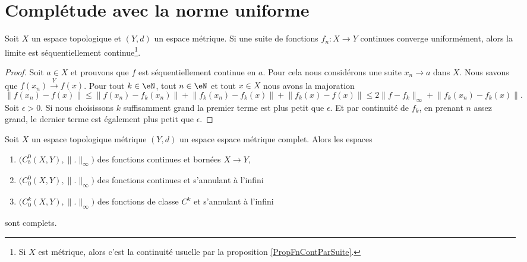 
\section{Complétude avec la norme uniforme}

\begin{proposition}\label{PropCZslHBx}
    Soit \( X\) un espace topologique et \( (Y,d)\) un espace métrique. Si une suite de fonctions \( f_n\colon X\to Y\) continues converge uniformément, alors la limite est séquentiellement continue\footnote{Si \( X\) est métrique, alors c'est la continuité usuelle par la proposition \ref{PropFnContParSuite}.}.
\end{proposition}

\begin{proof}
    Soit \( a\in X\) et prouvons que \( f\) est séquentiellement continue en \( a\). Pour cela nous considérons une suite \( x_n\to a\) dans \( X\). Nous savons que \( f(x_n)\stackrel{Y}{\longrightarrow}f(x)\). Pour tout \(k\in \eN\), tout \( n\in \eN\) et tout \( x\in X\) nous avons la majoration
    \begin{equation}
        \big\| f(x_n)-f(x) \big\|\leq \big\| f(x_n)-f_k(x_n) \big\|+\big\| f_k(x_n)-f_k(x) \big\|+\big\| f_k(x)-f(x) \big\|\leq 2\| f-f_k \|_{\infty}+\big\| f_k(x_n)-f_k(x) \big\|.    
    \end{equation}
    Soit \( \epsilon>0\). Si nous choisissons \( k\) suffisamment grand la premier terme est plus petit que \( \epsilon\). Et par continuité de \( f_k\), en prenant \( n\) assez grand, le dernier terme est également plus petit que \( \epsilon\).
\end{proof}

\begin{proposition} \label{PropSYMEZGU}
    Soit \( X\) un espace topologique métrique \( (Y,d)\) un espace espace métrique complet. Alors les espaces
    \begin{enumerate}
        \item
            \( \big( C^0_b(X,Y),\| . \|_{\infty} \big)\) des fonctions continues et bornées \( X\to Y\),
        \item
            \( \big( C^0_0(X,Y),\| . \|_{\infty} \big)\) des fonctions continues et s'annulant à l'infini
        \item
            \( \big( C^k_0(X,Y),\| . \|_{\infty} \big)\) des fonctions de classe \( C^k\) et s'annulant à l'infini
    \end{enumerate} 
    sont complets.
\end{proposition}

